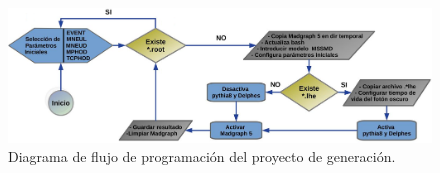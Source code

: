 


\begin{figure}[!ht]
\centering
\includegraphics[width=1\textwidth]{Simulacion/imagenes/proceso_genera_darksusy.png}
\caption{Diagrama de flujo de programación del proyecto de generación.}
\label{genera_darksusy2}
\end{figure}

